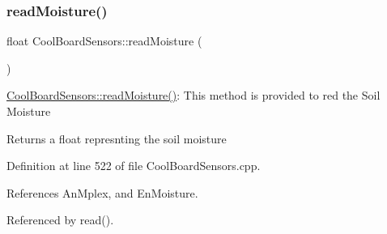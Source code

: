 \mbox{\label{classCoolBoardSensors_a8761bff50373c485f4465c8db47d0633}} 
\subsubsection{\texorpdfstring{read\+Moisture()}{readMoisture()}}
{\footnotesize\ttfamily float Cool\+Board\+Sensors\+::read\+Moisture (\begin{DoxyParamCaption}{ }\end{DoxyParamCaption})}

\hyperlink{classCoolBoardSensors_a8761bff50373c485f4465c8db47d0633}{Cool\+Board\+Sensors\+::read\+Moisture()}\+: This method is provided to red the Soil Moisture

\begin{DoxyReturn}{Returns}
a float represnting the soil moisture 
\end{DoxyReturn}


Definition at line 522 of file Cool\+Board\+Sensors.\+cpp.



References An\+Mplex, and En\+Moisture.



Referenced by read().


